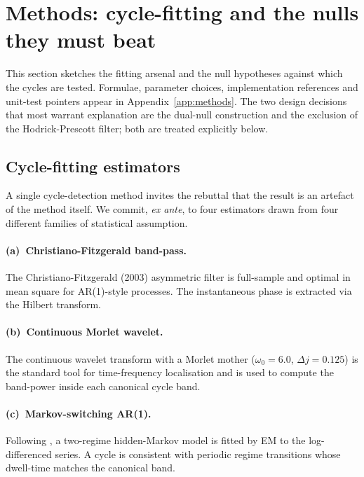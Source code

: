 \section{Methods: cycle-fitting and the nulls they must beat}
\label{sec:methods}

This section sketches the fitting arsenal and the null hypotheses
against which the cycles are tested. Formulae, parameter choices,
implementation references and unit-test pointers appear in
Appendix~\ref{app:methods}. The two design decisions that most
warrant explanation are the dual-null construction and the exclusion
of the Hodrick-Prescott filter; both are treated explicitly below.

\subsection{Cycle-fitting estimators}

A single cycle-detection method invites the rebuttal that the result
is an artefact of the method itself. We commit, \emph{ex ante}, to
four estimators drawn from four different families of statistical
assumption.

\paragraph{(a)~Christiano-Fitzgerald band-pass.}
The Christiano-Fitzgerald (2003) asymmetric filter
\citep{christiano_fitzgerald2003} is full-sample and optimal in
mean square for AR(1)-style processes. The instantaneous phase is
extracted via the Hilbert transform.

\paragraph{(b)~Continuous Morlet wavelet.}
The continuous wavelet transform with a Morlet mother
(\(\omega_0=6.0\), \(\Delta j=0.125\)) is the standard tool for
time-frequency localisation
\citep{torrence_compo1998,grinsted_moore_jevrejeva2004} and is used
to compute the band-power inside each canonical cycle band.

\paragraph{(c)~Markov-switching AR(1).}
Following \citet{hamilton1989}, a two-regime hidden-Markov model is
fitted by EM to the log-differenced series. A cycle is consistent
with periodic regime transitions whose dwell-time matches the
canonical band.

